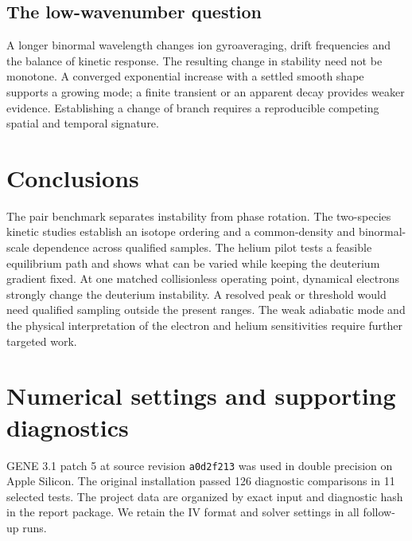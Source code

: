 \documentclass[11pt,letterpaper]{article}
\begin{document}
\subsection{The low-wavenumber question}
\LowKyResult

A longer binormal wavelength changes ion gyroaveraging, drift frequencies and the balance of kinetic response. The resulting change in stability need not be monotone. A converged exponential increase with a settled smooth shape supports a growing mode; a finite transient or an apparent decay provides weaker evidence. Establishing a change of branch requires a reproducible competing spatial and temporal signature.

\section{Conclusions}
The pair benchmark separates instability from phase rotation. The two-species kinetic studies establish an isotope ordering and a common-density and binormal-scale dependence across qualified samples. The helium pilot tests a feasible equilibrium path and shows what can be varied while keeping the deuterium gradient fixed. At one matched collisionless operating point, dynamical electrons strongly change the deuterium instability. A resolved peak or threshold would need qualified sampling outside the present ranges. The weak adiabatic mode and the physical interpretation of the electron and helium sensitivities require further targeted work.

\clearpage
\appendix
\section{Numerical settings and supporting diagnostics}\label{app:numerical}
GENE 3.1 patch 5 at source revision \texttt{a0d2f213} was used in double precision on Apple Silicon. The original installation passed 126 diagnostic comparisons in 11 selected tests. The project data are organized by exact input and diagnostic hash in the report package. We retain the IV format and solver settings in all follow-up runs.
\end{document}
